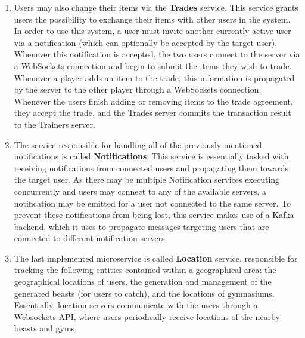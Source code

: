 \begin{enumerate}
    \item Users may also change their items via the \textbf{Trades} service. This service grants users the possibility to exchange their items with other users in the system. In order to use this system, a user must invite another currently active user via a notification (which can optionally be accepted by the target user). Whenever this notification is accepted, the two users connect to the server via a WebSockets connection and begin to submit the items they wish to trade. Whenever a player adds an item to the trade, this information is propagated by the server to the other player through a WebSockets connection. Whenever the users finish adding or removing items to the trade agreement, they accept the trade, and the Trades server commits the transaction result to the Trainers server.

    \item The service responsible for handling all of the previously mentioned notifications is called \textbf{Notifications}. This service is essentially tasked with receiving notifications from connected users and propagating them towards the target user. As there may be multiple Notification services executing concurrently and users may connect to any of the available servers, a notification may be emitted for a user not connected to the same server. To prevent these notifications from being lost, this service makes use of a Kafka \cite{apache_kafka} backend, which it uses to propagate messages targeting users that are connected to different notification servers.

    \item The last implemented microservice is called \textbf{Location} service, responsible for tracking the following entities contained within a geographical area: the geographical locations of users, the generation and management of the generated beasts (for users to catch), and the locations of gymnasiums. Essentially, location servers communicate with the users through a Websockets API, where users periodically receive locations of the nearby beasts and gyms. 
\end{enumerate}


